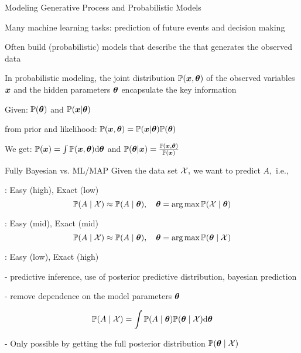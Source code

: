 \documentclass[handout,fleqn,aspectratio=169]{beamer}
\begin{document}
\begin{frame}{Modeling Generative Process and Probabilistic Models}

\plitemsep 0.1in

\bci 

\item Many machine learning tasks: prediction of future events and decision making

\item Often build (probabilistic) models that describe the  that generates the observed data

\item In probabilistic modeling, the joint distribution $\mathbb{P}( \bm{x},\bm{\theta} )$ of the observed variables 
$\bm{x}$ and the hidden parameters $\bm{\theta}$ encapsulate the key information
\bci
\item Given:  $\mathbb{P}( \bm{\theta} )$ and  $\mathbb{P}( \bm{x} | \bm{\theta} )$
\item {} from prior and likelihood: $\mathbb{P}( \bm{x},\bm{\theta} ) = \mathbb{P}( \bm{x} | \bm{\theta} ) \mathbb{P}( \bm{\theta} )$
\item We get:  $\mathbb{P}( \bm{x} ) = \int \mathbb{P}( \bm{x},\bm{\theta} ) \text{d}\bm{\theta}$ and  $\mathbb{P}( \bm{\theta}|\bm{x} ) = \frac{\mathbb{P}( \bm{x},\bm{\theta} )}{\mathbb{P}( \bm{x} )}$
\eci

\eci
\end{frame}

\begin{frame}{Fully Bayesian vs. ML/MAP}
Given the data set $\mathcal X,$ we want to predict $A,$ i.e., 
\plitemsep 0.05in
\bci 
\item {}: Easy (high), Exact (low)
$$
\mathbb{P}( A \mid \mathcal X ) \approx \mathbb{P}( A \mid \bm{\theta} ), \quad \bm{\theta} = \arg\max \mathbb{P}( \mathcal X \mid \bm{\theta} )
$$

\item {}: Easy (mid), Exact (mid)
$$
\mathbb{P}( A \mid \mathcal X ) \approx \mathbb{P}( A \mid \bm{\theta} ), \quad \bm{\theta} = \arg\max \mathbb{P}( \bm{\theta} \mid \mathcal X )
$$

\item {}: Easy (low), Exact (high)

\medskip
- predictive inference, use of posterior predictive distribution, bayesian prediction

- remove dependence on the model parameters $\bm{\theta}$

$$
\mathbb{P}( A \mid \mathcal X ) = \int \mathbb{P}( A \mid \bm{\theta} ) \mathbb{P}( \bm{\theta} \mid \mathcal X )\text{d}\bm{\theta}
$$

- Only possible by getting the full posterior distribution $\mathbb{P}( \bm{\theta} \mid \mathcal X )$
\eci
\end{frame}
\end{document}
